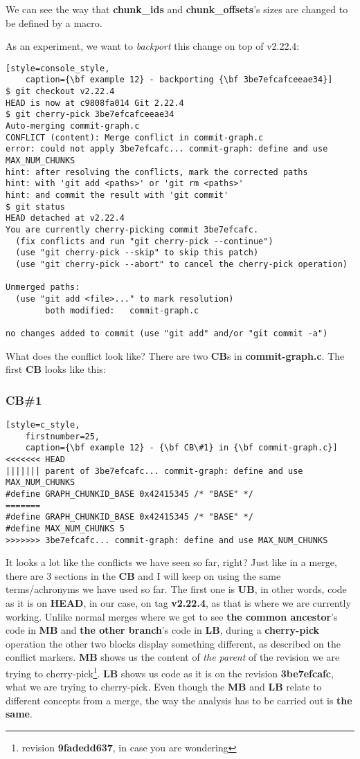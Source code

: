We can see the way that {\bf chunk\_ids} and {\bf chunk\_offsets}'s sizes are changed to be defined by a macro.

As an experiment, we want to {\it backport} this change on top of v2.22.4:

\begin{lstlisting}[style=console_style,
	caption={\bf example 12} - backporting {\bf 3be7efcafceeae34}]
$ git checkout v2.22.4
HEAD is now at c9808fa014 Git 2.22.4
$ git cherry-pick 3be7efcafceeae34
Auto-merging commit-graph.c
CONFLICT (content): Merge conflict in commit-graph.c
error: could not apply 3be7efcafc... commit-graph: define and use MAX_NUM_CHUNKS
hint: after resolving the conflicts, mark the corrected paths
hint: with 'git add <paths>' or 'git rm <paths>'
hint: and commit the result with 'git commit'
$ git status
HEAD detached at v2.22.4
You are currently cherry-picking commit 3be7efcafc.
  (fix conflicts and run "git cherry-pick --continue")
  (use "git cherry-pick --skip" to skip this patch)
  (use "git cherry-pick --abort" to cancel the cherry-pick operation)

Unmerged paths:
  (use "git add <file>..." to mark resolution)
        both modified:   commit-graph.c

no changes added to commit (use "git add" and/or "git commit -a")
\end{lstlisting}

What does the conflict look like? There are two {\bf CB}s in {\bf commit-graph.c}. The first {\bf CB} looks like this:

\subsubsection{CB\#1}
\begin{lstlisting}[style=c_style,
	firstnumber=25,
	caption={\bf example 12} - {\bf CB\#1} in {\bf commit-graph.c}]
<<<<<<< HEAD
||||||| parent of 3be7efcafc... commit-graph: define and use MAX_NUM_CHUNKS
#define GRAPH_CHUNKID_BASE 0x42415345 /* "BASE" */
=======
#define GRAPH_CHUNKID_BASE 0x42415345 /* "BASE" */
#define MAX_NUM_CHUNKS 5
>>>>>>> 3be7efcafc... commit-graph: define and use MAX_NUM_CHUNKS
\end{lstlisting}

It looks a lot like the conflicts we have seen so far, right? Just like in a merge, there are 3 sections in the {\bf CB} and
I will keep on using the same terms/achronyms we have used so far. The first one is {\bf UB}, in other words, code as it is on
{\bf HEAD}, in our case, on tag {\bf v2.22.4}, as that is where we are currently working. Unlike normal merges where
we get to see {\bf the common ancestor}'s code in {\bf MB} and {\bf the other branch}'s code in {\bf LB}, during a
{\bf cherry-pick} operation the other two blocks display something different, as described on the conflict markers.
{\bf MB} shows us the content of {\it the parent} of the revision we are trying to cherry-pick\footnote{revision {\bf 9fadedd637},
in case you are wondering}. {\bf LB} shows us code as it is on the revision {\bf 3be7efcafc}, what we are trying to cherry-pick.
Even though the {\bf MB} and {\bf LB} relate to different concepts from a merge, the way the analysis has to be carried out is
{\bf the same}.

